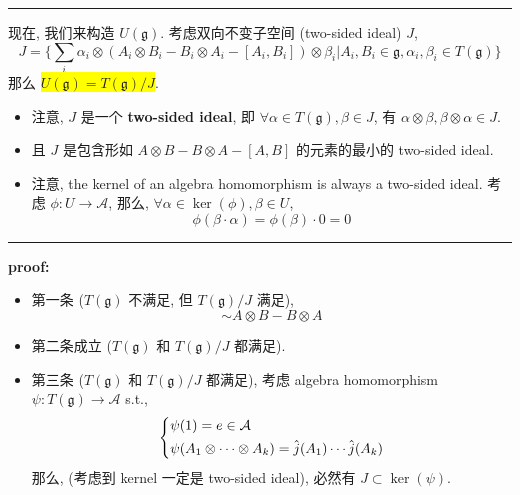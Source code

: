 \begin{itemize}
\begin{tcolorbox}[title=proof:]
		\noindent\rule[0.5ex]{\linewidth}{0.5pt} %
		
		现在, 我们来构造 $U(\mathfrak{g})$. 考虑双向不变子空间 (two-sided ideal) $J$,
		\begin{equation}
			J = \Big\{ \sum_i \alpha_i \otimes (A_i \otimes B_i - B_i \otimes A_i - [A_i, B_i]) \otimes \beta_i \Big| A_i, B_i \in \mathfrak{g}, \alpha_i, \beta_i \in T(\mathfrak{g}) \Big\}
		\end{equation}
		那么 \colorbox{yellow}{$U(\mathfrak{g}) = T(\mathfrak{g}) / J$}.
		\begin{itemize}
			\item 注意, $J$ 是一个 \textbf{two-sided ideal}, 即 $\forall \alpha \in T(\mathfrak{g}), \beta \in J$, 有 $\alpha \otimes \beta, \beta \otimes \alpha \in J$.
			
			\item 且 $J$ 是包含形如 $A \otimes B - B \otimes A - [A, B]$ 的元素的最小的 two-sided ideal.
			
			\item 注意, the kernel of an algebra homomorphism is always a two-sided ideal. 考虑 $\phi : U \rightarrow \mathcal{A}$, 那么, $\forall \alpha \in \ker(\phi), \beta \in U$,
			\begin{equation}
				\phi(\beta \cdot \alpha) = \phi(\beta) \cdot 0 = 0
			\end{equation}
		\end{itemize}
		
		\noindent\rule[0.5ex]{\linewidth}{0.5pt} %
		
		\textbf{proof:}
		
		\begin{itemize}
			\item 第一条 ($T(\mathfrak{g})$ 不满足, 但 $T(\mathfrak{g}) / J$ 满足),
			\begin{equation}
				[A, B] \sim A \otimes B - B \otimes A
			\end{equation}
			
			\item 第二条成立 ($T(\mathfrak{g})$ 和 $T(\mathfrak{g}) / J$ 都满足).
			
			\item 第三条 ($T(\mathfrak{g})$ 和 $T(\mathfrak{g}) / J$ 都满足), 考虑 algebra homomorphism $\psi : T(\mathfrak{g}) \rightarrow \mathcal{A}$ s.t.,
			\begin{equation}
				\begin{dcases}
					\psi(1) = e \in \mathcal{A} \\
					\psi(A_1 \otimes \cdots \otimes A_k) = \hat{j}(A_1) \cdots \hat{j}(A_k)
				\end{dcases}
			\end{equation}
			那么, (考虑到 kernel 一定是 two-sided ideal), 必然有 $J \subset \ker(\psi)$.
			

\end{itemize}
\end{tcolorbox}
\end{itemize}
